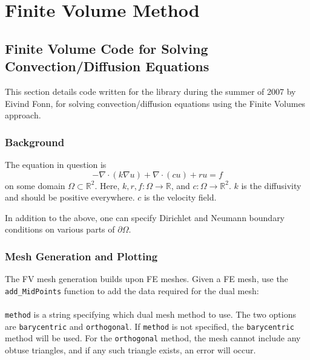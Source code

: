 
\chapter{Finite Volume Method} \label{chapt:fvm_conv_diff}



\section{Finite Volume Code for Solving Convection/Dif\-fusion Equations} \label{sect:fvm_conv_diff}

This section details code written for the \LIBNAME library during
the summer of 2007 by Eivind Fonn, for solving convection/diffusion equations
using the Finite Volumes approach.

\subsection{Background}

The equation in question is
\[ -\nabla\cdot(k\nabla u) + \nabla\cdot(cu) + ru = f \]
on some domain $\Omega\subset\mathbb{R}^2$. Here, $k,r,f:\Omega\to\mathbb{R}$,
and $c:\Omega\to\mathbb{R}^2$. $k$ is the diffusivity and should be positive 
everywhere. $c$ is the velocity field.

In addition to the above, one can specify Dirichlet and Neumann boundary
conditions on various parts of $\partial\Omega$.

\subsection{Mesh Generation and Plotting}

The FV mesh generation builds upon FE meshes. Given a FE mesh, use the
{\tt add\_MidPoints} function to add the data required for the dual mesh: \\

 \\

{\tt method} is a string specifying which dual mesh method to use. The two
options are {\tt barycentric} and {\tt orthogonal}. If {\tt method}
is not specified, the {\tt barycentric} method will be used. For the
{\tt orthogonal} method, the mesh cannot include any obtuse triangles, and
if any such triangle exists, an error will occur.

